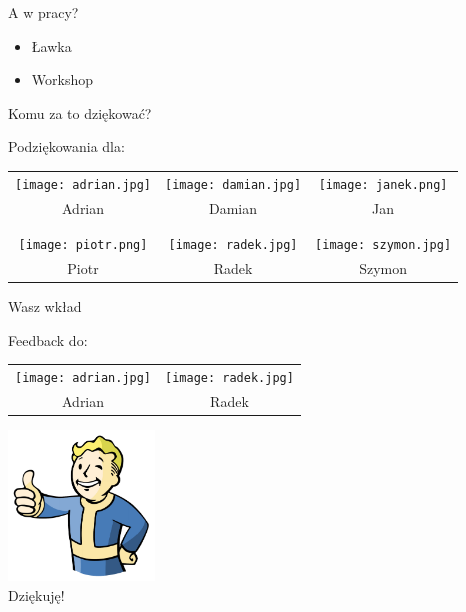 \documentclass{beamer}
\begin{document}
\begin{frame}{}
	\begin{center}
		\Huge{A w pracy?}
	\end{center}
\end{frame}

\begin{frame}{}
	\begin{huge}
		\begin{itemize}
			\item Ławka
			\item Workshop
		\end{itemize}
	\end{huge}
\end{frame}

\begin{frame}{}
	\begin{center}
		\Huge{Komu za to dziękować?}
	\end{center}
\end{frame}

\begin{frame}{Podziękowania dla:}
	\begin{center}
		\begin{tabular}{ c c c }			
		 	\texttt{[image: adrian.jpg]} & \texttt{[image: damian.jpg]} & \texttt{[image: janek.png]} \\ 
			Adrian & Damian & Jan \\ \\ \\
		 	\texttt{[image: piotr.png]} & \texttt{[image: radek.jpg]} & \texttt{[image: szymon.jpg]} \\
			Piotr & Radek & Szymon
		\end{tabular}
	\end{center}
\end{frame}

\begin{frame}{}
	\begin{center}
		\Huge{Wasz wkład}
	\end{center}
\end{frame}

\begin{frame}{Feedback do:}
	\begin{center}
		\begin{tabular}{ c c }
			\\
		 	\texttt{[image: adrian.jpg]} & \texttt{[image: radek.jpg]} \\
			Adrian & Radek 
		\end{tabular}
	\end{center}
\end{frame}

\begin{frame}{}
	\begin{center}
  		\includegraphics[height=4cm]{ok.png} \\
		\Huge{Dziękuję!}
	\end{center}
\end{frame}
\end{document}

